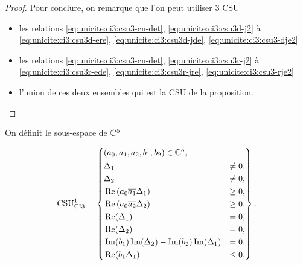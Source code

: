 \begin{proof}
    Pour conclure, on remarque que l'on peut utiliser 3 CSU
    \begin{itemize}
      \item les relations \eqref{eq:unicite:ci3:csu3-cn-det}, \eqref{eq:unicite:ci3:csu3d-j2} à \eqref{eq:unicite:ci3:csu3d-ere}, \eqref{eq:unicite:ci3:csu3d-jde}, \eqref{eq:unicite:ci3:csu3-dje2}
      \item les relations \eqref{eq:unicite:ci3:csu3-cn-det}, \eqref{eq:unicite:ci3:csu3r-j2} à \eqref{eq:unicite:ci3:csu3r-ede}, \eqref{eq:unicite:ci3:csu3r-jre}, \eqref{eq:unicite:ci3:csu3-rje2}
      \item l'union de ces deux ensembles qui est la CSU de la proposition.
    \end{itemize}

    \end{proof}
  \begin{defn}
    \label{def:csu:ci3-0}

    On définit le sous-espace de \(\CC^5\)

    \begin{equation*}
      \CSU[1]{CI3} = \left\lbrace 
      \begin{aligned}
      &(a_0,a_1,a_2,b_1,b_2) \in \CC^5,
      \\
      &\begin{aligned}
        &\Delta_1 & \not= 0,
        \\
        &\Delta_2 & \not= 0,
        \\
        &\Re\left(a_0\conj{a_1}\Delta_1\right) &\ge 0,
        \\
        &\Re\left(a_0\conj{a_2}\Delta_2\right) &\ge 0,
        \\
        &\Re(\Delta_1) &= 0,
        \\
        &\Re(\Delta_2) &= 0,
        \\
        &\Im(b_1)\Im(\Delta_2) - \Im(b_2)\Im(\Delta_1) &= 0,
        \\
        &\Re(b_1\Delta_1) &\le 0.
        \end{aligned}
      \end{aligned}
      \right\rbrace.
    \end{equation*}
  \end{defn}
  
